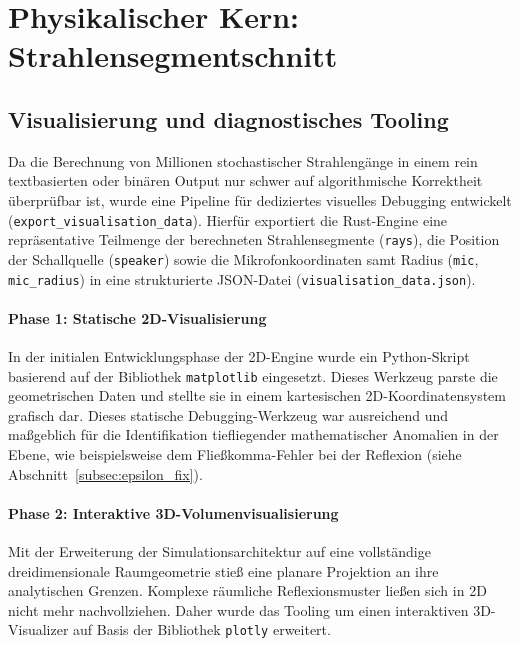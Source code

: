 \documentclass{article}
\begin{document}
    \section{Physikalischer Kern: Strahlensegmentschnitt}
    \label{sec:ray_intersection}

    \subsection{Visualisierung und diagnostisches Tooling}
    \label{subsec:visualizer}

    Da die Berechnung von Millionen stochastischer Strahlengänge in einem rein textbasierten oder binären Output nur schwer auf algorithmische Korrektheit überprüfbar ist,
    wurde eine Pipeline für dediziertes visuelles Debugging entwickelt (\texttt{export\_visualisation\_data}).
    Hierfür exportiert die Rust-Engine eine repräsentative Teilmenge der berechneten Strahlensegmente (\texttt{rays}),
    die Position der Schallquelle (\texttt{speaker}) sowie die Mikrofonkoordinaten samt Radius (\texttt{mic}, \texttt{mic\_radius}) in eine strukturierte JSON-Datei (\texttt{visualisation\_data.json}).

    \paragraph{Phase 1: Statische 2D-Visualisierung}
    In der initialen Entwicklungsphase der 2D-Engine wurde ein Python-Skript basierend auf der Bibliothek \texttt{matplotlib} eingesetzt.
    Dieses Werkzeug parste die geometrischen Daten und stellte sie in einem kartesischen 2D-Koordinatensystem grafisch dar.
    Dieses statische Debugging-Werkzeug war ausreichend und maßgeblich für die Identifikation tiefliegender mathematischer Anomalien in der Ebene, wie beispielsweise dem Fließkomma-Fehler bei der Reflexion (siehe Abschnitt~\ref{subsec:epsilon_fix}).

    \paragraph{Phase 2: Interaktive 3D-Volumenvisualisierung}
    Mit der Erweiterung der Simulationsarchitektur auf eine vollständige dreidimensionale Raumgeometrie stieß eine planare Projektion an ihre analytischen Grenzen.
    Komplexe räumliche Reflexionsmuster ließen sich in 2D nicht mehr nachvollziehen.
    Daher wurde das Tooling um einen interaktiven 3D-Visualizer auf Basis der Bibliothek \texttt{plotly} erweitert.
\end{document}
